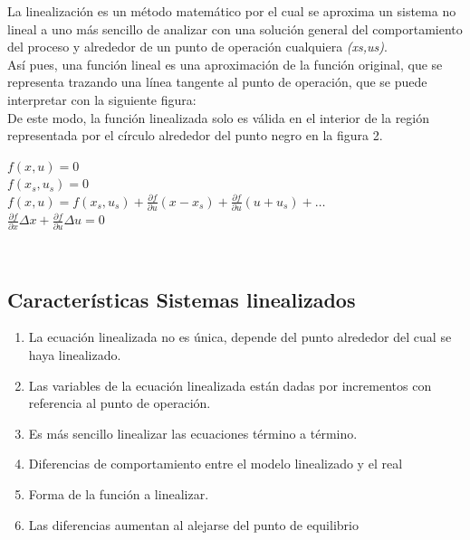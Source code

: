 \documentclass[a4paper,12pt,twoside]{proyectotanquesecci}
\begin{document}

La linealización es un método matemático por el cual se aproxima un sistema no lineal a uno más sencillo de analizar con una solución general del comportamiento del proceso y alrededor de un punto de operación cualquiera \textit{(xs,us)}.\\

Así pues, una función lineal es una aproximación de la función original, que se representa trazando una línea tangente al punto de operación, que se puede interpretar con la siguiente figura:\\


De este modo, la función linealizada solo es válida en el interior de la región representada por el círculo alrededor del punto negro en la figura 2.

\begin{center}
	$f\left( x,u\right)=0$ \\
	$f\left( x_{s},u_{s}\right) =0$ \\
	$f\left( x,u\right) = f\left( x_{s},u_{s}\right) +\frac {\partial f}{\partial u}\left( x-x_{s}\right) +\frac {\partial f}{\partial u}\left( u+u_{s}\right) +\ldots$ \\
	$\frac {\partial f}{\partial x}\Delta x+\frac {\partial f}{\partial u}\Delta u=0$
\end{center}

\subsection{Características Sistemas linealizados}

\begin{enumerate}
\item La ecuación linealizada no es única, depende del punto alrededor del cual se haya linealizado.
\item Las variables de la ecuación linealizada están dadas por incrementos con referencia al punto de operación.
\item Es más sencillo linealizar las ecuaciones término a término.
\item Diferencias de comportamiento entre el modelo linealizado y el real
\item Forma de la función a linealizar.
\item Las diferencias aumentan al alejarse del punto de equilibrio 
\end{enumerate}
\end{document}
